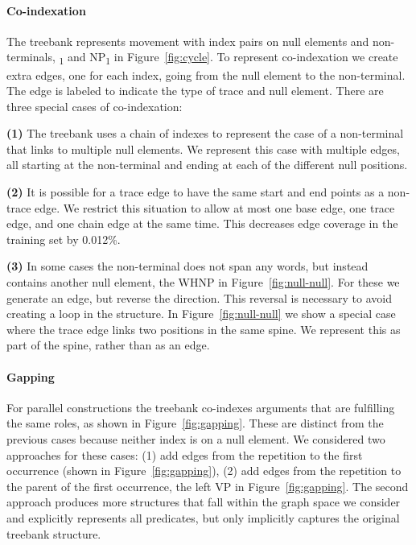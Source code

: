 \paragraph{Co-indexation}
The treebank represents movement with index pairs on null elements and non-terminals, \myeg *\textsubscript{1} and NP\textsubscript{1} in Figure~\ref{fig:cycle}.
To represent co-indexation we create extra edges, one for each index, going from the null element to the non-terminal.
The edge is labeled to indicate the type of trace and null element.
There are three special cases of co-indexation:

\textbf{(1)}
The treebank uses a chain of indexes to represent the case of a non-terminal that links to multiple null elements.
We represent this case with multiple edges, all starting at the non-terminal and ending at each of the different null positions.

\textbf{(2)}
It is possible for a trace edge to have the same start and end points as a non-trace edge.
We restrict this situation to allow at most one base edge, one trace edge, and one chain edge at the same time.
This decreases edge coverage in the training set by 0.012\%.

\textbf{(3)}
In some cases the non-terminal does not span any words, but instead contains another null element, \myeg the WHNP in Figure~\ref{fig:null-null}.
For these we generate an edge, but reverse the direction.
This reversal is necessary to avoid creating a loop in the structure.
In Figure~\ref{fig:null-null} we show a special case where the trace edge links two positions in the same spine.
We represent this as part of the spine, rather than as an edge.

\paragraph{Gapping}
For parallel constructions the treebank co-indexes arguments that are fulfilling the same roles, as shown in Figure~\ref{fig:gapping}.
These are distinct from the previous cases because neither index is on a null element.
We considered two approaches for these cases: (1) add edges from the repetition to the first occurrence (shown in Figure~\ref{fig:gapping}), (2) add edges from the repetition to the parent of the first occurrence, \myeg the left VP in Figure~\ref{fig:gapping}.
The second approach produces more structures that fall within the graph space we consider and explicitly represents all predicates, but only implicitly captures the original treebank structure.

